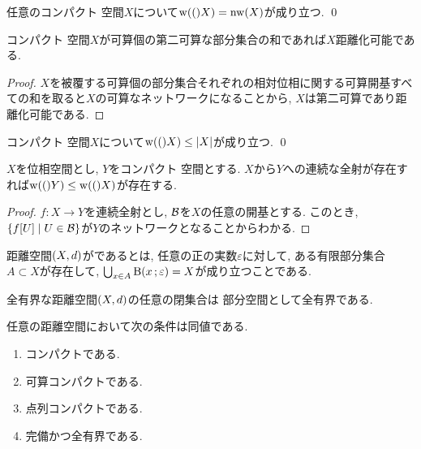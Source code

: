 \documentclass[uplatex, dvipdfmx, a4paper, 12pt, class=jsbook, crop=false]{standalone}
\begin{document}
\begin{corollary}
	\label{coro:Weight in a compact Hausdorff space is equal to network weight}
	任意のコンパクト  空間$ X $について$ \topweight(X) = \topnetwork(X) $が成り立つ.
	\qed
\end{corollary}

\begin{corollary}
	コンパクト  空間$ X $が可算個の第二可算な部分集合の和であれば$ X $距離化可能である.
\end{corollary}

\begin{proof}
	$ X $を被覆する可算個の部分集合それぞれの相対位相に関する可算開基すべての和を取ると$ X $の可算なネットワークになることから, $ X $は第二可算であり距離化可能である.
\end{proof}

\begin{corollary}
	コンパクト  空間$ X $について$ \topweight(X) \leq \cardinality{X} $が成り立つ.
	\qed
\end{corollary}

\begin{corollary}
	$ X $を位相空間とし, $ Y $をコンパクト  空間とする.
	$ X $から$ Y $への連続な全射が存在すれば$ \topweight(Y) \leq \topweight(X) $が存在する.
\end{corollary}

\begin{proof}
	$ f \colon X \to Y $を連続全射とし, $ \mathcal{B} $を$ X $の任意の開基とする.
	このとき, $ \setcomp{f[U]}{U \in \topbasis} $が$ Y $のネットワークとなることからわかる.
\end{proof}

\begin{definition}
	距離空間$ \lrparen{X, d} $がであるとは,
	任意の正の実数\( \varepsilon \)に対して,
	ある有限部分集合\( A \subset X \)が存在して,
	\( \bigcup_{x \in A} \topball{x}{\varepsilon} = X \)が成り立つことである.
\end{definition}

\begin{proposition}
	\label{cpt00002}
	全有界な距離空間\( \lrparen{X, d} \)の任意の閉集合は
	部分空間として全有界である.
\end{proposition}

\begin{proposition}
	任意の距離空間において次の条件は同値である.
	\begin{enumerate}
		\item コンパクトである.
		\item 可算コンパクトである.
		\item 点列コンパクトである.
		\item 完備かつ全有界である.
	\end{enumerate}
\end{proposition}
\end{document}
